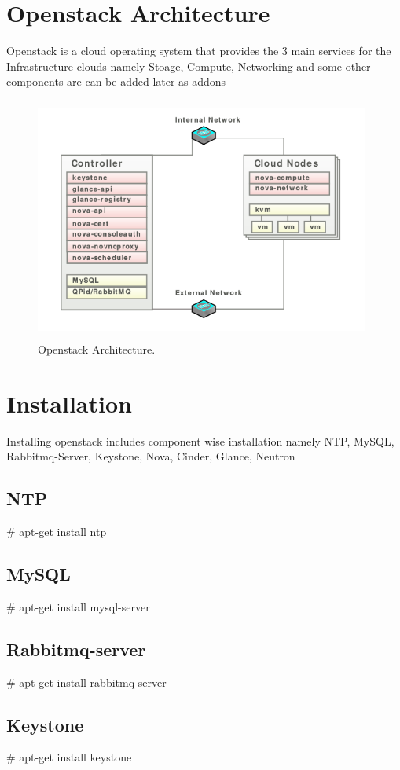 \documentclass[12pt]{report}
\begin{document}
\section{Openstack Architecture}
Openstack is a cloud operating system that provides the 3 main services for the Infrastructure clouds namely Stoage, Compute, Networking and some other components are can be added later as addons
\underline{} \newline
\begin{figure}[H]
	\begin{center}
	\includegraphics[width=11cm,height=8cm]{./openstack_1.png}
	\caption{ Openstack Architecture.\label{fig:Openstack Architecture }}
	\end{center}
\end{figure}

\section{Installation}

Installing openstack includes component wise installation namely NTP, MySQL, Rabbitmq-Server, Keystone, Nova, Cinder, Glance, Neutron
\subsection{NTP}
\# apt-get install ntp
\subsection{MySQL}
\# apt-get install mysql-server
\subsection{Rabbitmq-server}
\# apt-get install rabbitmq-server
\subsection{Keystone}
\# apt-get install keystone
\end{document}
